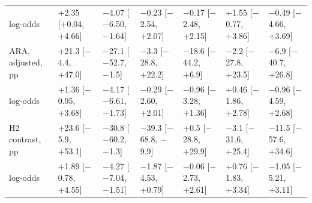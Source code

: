 \begin{table}[t]
\begin{tabular}{@{}lllllll@{}}
\quad log-odds & +2.35 [+0.04, +4.66] & $-$4.07 [$-$6.50, $-$1.64] & $-$0.23 [$-$2.54, +2.07] & $-$0.17 [$-$2.48, +2.15] & +1.55 [$-$0.77, +3.86] & $-$0.49 [$-$4.66, +3.69] \\
ARA, adjusted, pp & +21.3 [$-$4.4, +47.0] & $-$27.1 [$-$52.7, $-$1.5] & $-$3.3 [$-$28.8, +22.2] & $-$18.6 [$-$44.2, +6.9] & $-$2.2 [$-$27.8, +23.5] & $-$6.9 [$-$40.7, +26.8] \\
\quad log-odds & +1.36 [$-$0.95, +3.68] & $-$4.17 [$-$6.61, $-$1.73] & $-$0.29 [$-$2.60, +2.01] & $-$0.96 [$-$3.28, +1.36] & +0.46 [$-$1.86, +2.78] & $-$0.96 [$-$4.59, +2.68] \\
\midrule
H2 contrast, pp & +23.6 [$-$5.9, +53.1] & $-$30.8 [$-$60.2, $-$1.3] & $-$39.3 [$-$68.8, $-$9.9] & +0.5 [$-$28.8, +29.9] & $-$3.1 [$-$31.6, +25.4] & $-$11.5 [$-$57.6, +34.6] \\
\quad log-odds & +1.89 [$-$0.78, +4.55] & $-$4.27 [$-$7.04, $-$1.51] & $-$1.87 [$-$4.53, +0.79] & $-$0.06 [$-$2.73, +2.61] & +0.76 [$-$1.83, +3.34] & $-$1.05 [$-$5.21, +3.11] \\
\bottomrule
\end{tabular}
\end{table}
